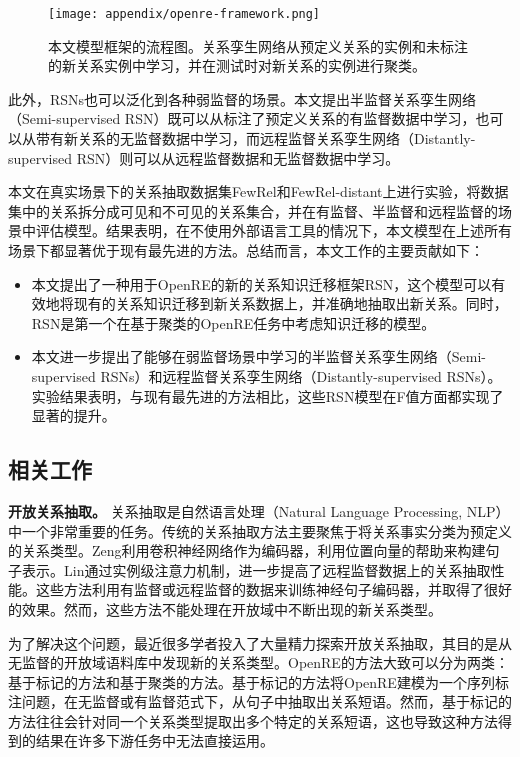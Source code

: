 \begin{translation}
\begin{figure*}
	\centering
	\texttt{[image: appendix/openre-framework.png]}
	\caption{本文模型框架的流程图。关系孪生网络从预定义关系的实例和未标注的新关系实例中学习，并在测试时对新关系的实例进行聚类。}
	\label{fig:appendix:openre-framework}
\end{figure*}

此外，RSNs也可以泛化到各种弱监督的场景。本文提出半监督关系孪生网络（Semi-supervised RSN）既可以从标注了预定义关系的有监督数据中学习，也可以从带有新关系的无监督数据中学习，而远程监督关系孪生网络（Distantly-supervised RSN）则可以从远程监督数据和无监督数据中学习。

本文在真实场景下的关系抽取数据集FewRel和FewRel-distant上进行实验，将数据集中的关系拆分成可见和不可见的关系集合，并在有监督、半监督和远程监督的场景中评估模型。结果表明，在不使用外部语言工具的情况下，本文模型在上述所有场景下都显著优于现有最先进的方法。总结而言，本文工作的主要贡献如下：
\begin{itemize}
	\item 本文提出了一种用于OpenRE的新的关系知识迁移框架RSN，这个模型可以有效地将现有的关系知识迁移到新关系数据上，并准确地抽取出新关系。同时，RSN是第一个在基于聚类的OpenRE任务中考虑知识迁移的模型。
	\item 本文进一步提出了能够在弱监督场景中学习的半监督关系孪生网络（Semi-supervised RSNs）和远程监督关系孪生网络（Distantly-supervised RSNs）。实验结果表明，与现有最先进的方法相比，这些RSN模型在F值方面都实现了显著的提升。
\end{itemize}

\subsection{相关工作}
\textbf{开放关系抽取。} 关系抽取是自然语言处理（Natural Language Processing, NLP）中一个非常重要的任务。传统的关系抽取方法主要聚焦于将关系事实分类为预定义的关系类型。Zeng利用卷积神经网络作为编码器，利用位置向量的帮助来构建句子表示。Lin通过实例级注意力机制，进一步提高了远程监督数据上的关系抽取性能。这些方法利用有监督或远程监督的数据来训练神经句子编码器，并取得了很好的效果。然而，这些方法不能处理在开放域中不断出现的新关系类型。

为了解决这个问题，最近很多学者投入了大量精力探索开放关系抽取，其目的是从无监督的开放域语料库中发现新的关系类型。OpenRE的方法大致可以分为两类：基于标记的方法和基于聚类的方法。基于标记的方法将OpenRE建模为一个序列标注问题，在无监督或有监督范式下，从句子中抽取出关系短语。然而，基于标记的方法往往会针对同一个关系类型提取出多个特定的关系短语，这也导致这种方法得到的结果在许多下游任务中无法直接运用。


\end{translation}
